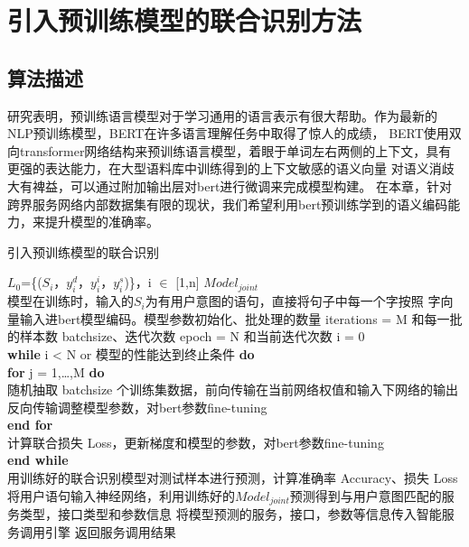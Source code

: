 \chapter{引入预训练模型的联合识别方法}

\section{算法描述}
研究表明，预训练语言模型对于学习通用的语言表示有很大帮助。作为最新的NLP预训练模型，BERT在许多语言理解任务中取得了惊人的成绩，
BERT使用双向transformer网络结构来预训练语言模型，着眼于单词左右两侧的上下文，具有更强的表达能力，在大型语料库中训练得到的上下文敏感的语义向量
对语义消歧大有裨益，可以通过附加输出层对bert进行微调来完成模型构建。
在本章，针对跨界服务网络内部数据集有限的现状，我们希望利用bert预训练学到的语义编码能力，来提升模型的准确率。

\begin{algorithm}
  \caption{引入预训练模型的联合识别}
  \label{alg:suanfa2}
  \begin{algorithmic}[1]
  \Require $L_0$=\{($S_i$，$y_i^d$，$y_i^i$，$y_i^s$)\}，i $\in$ [1,n]
  \Ensure $Model_{joint}$\\
模型在训练时，输入的$S_i$为有用户意图的语句，直接将句子中每一个字按照
字向量输入进bert模型编码。模型参数初始化、批处理的数量
iterations = M 和每一批的样本数 batchsize、迭代次数 epoch = N 和当前迭代次数 i = 0\\
\textbf{while} i < N or 模型的性能达到终止条件 \textbf{do}\\
\qquad \qquad \textbf{for} j = 1,\dots ,M \textbf{do}\\
\qquad \qquad \qquad \qquad 随机抽取 batchsize 个训练集数据，前向传输在当前网络权值和输入下网络的输出\\
\qquad \qquad \qquad \qquad 反向传输调整模型参数，对bert参数fine-tuning\\
\qquad \qquad \textbf{end for}\\
\qquad \qquad 计算联合损失 Loss，更新梯度和模型的参数，对bert参数fine-tuning\\
\textbf{end while}\\
用训练好的联合识别模型对测试样本进行预测，计算准确率 Accuracy、损失 Loss
  \State 将用户语句输入神经网络，利用训练好的$Model_{joint}$预测得到与用户意图匹配的服务类型，接口类型和参数信息
  \State 将模型预测的服务，接口，参数等信息传入智能服务调用引擎
  \State 返回服务调用结果
  \end{algorithmic}
  \end{algorithm}

